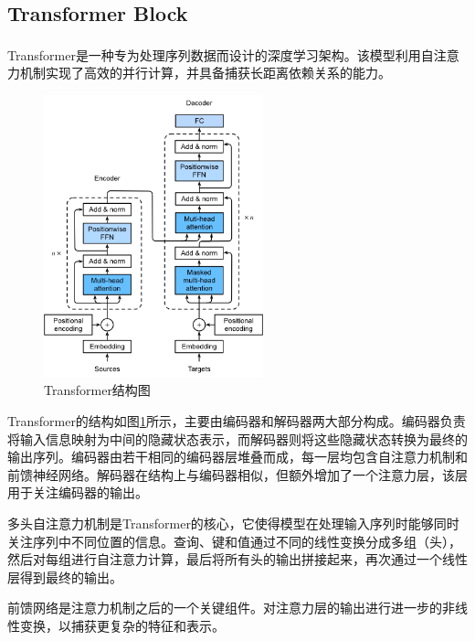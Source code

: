 \documentclass[journal]{IEEEtran}
\numberwithin{figure}{section}%
\numberwithin{table}{section}%
\numberwithin{equation}{section}
\begin{document}
\subsection{Transformer Block}
Transformer\textsuperscript{\cite{2}}是一种专为处理序列数据而设计的深度学习架构。该模型利用自注意力机制实现了高效的并行计算，并具备捕获长距离依赖关系的能力。\par

\begin{figure}
  \centering
  \includegraphics[width=2.5in]{./figures/4_3.png}
  \caption{Transformer结构图}
  \label{fig:Transformer}
\end{figure}

Transformer的结构如图\ref{fig:Transformer}所示，主要由编码器和解码器两大部分构成。编码器负责将输入信息映射为中间的隐藏状态表示，而解码器则将这些隐藏状态转换为最终的输出序列。编码器由若干相同的编码器层堆叠而成，每一层均包含自注意力机制和前馈神经网络。解码器在结构上与编码器相似，但额外增加了一个注意力层，该层用于关注编码器的输出。\par

多头自注意力机制是Transformer的核心，它使得模型在处理输入序列时能够同时关注序列中不同位置的信息。查询、键和值通过不同的线性变换分成多组（头），然后对每组进行自注意力计算，最后将所有头的输出拼接起来，再次通过一个线性层得到最终的输出。\par

前馈网络是注意力机制之后的一个关键组件。对注意力层的输出进行进一步的非线性变换，以捕获更复杂的特征和表示。\par
\end{document}
